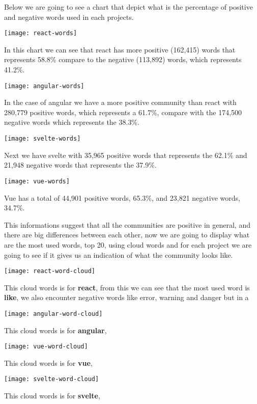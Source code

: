 Below we are going to see a chart that depict what is the percentage of positive and negative words used in each projects.

\begin{center}
    \texttt{[image: react-words]}    
\end{center}

In this chart we can see that react has more positive (162,415) words that represents 58.8\% compare to the negative (113,892) words, which represents 41.2\%.

\begin{center}
    \texttt{[image: angular-words]}    
\end{center}

In the case of angular we have a more positive community than react with 280,779 positive words, which represents a 61.7\%, compare with the 174,500 negative words which represents the 38.3\%.

\begin{center}
    \texttt{[image: svelte-words]}    
\end{center}

Next we have svelte with 35,965 positive words that represents the 62.1\% and 21,948 negative words that represents the 37.9\%.

\begin{center}
    \texttt{[image: vue-words]}    
\end{center}

Vue has a total of 44,901 positive words, 65.3\%, and 23,821 negative words, 34.7\%.

This informations suggest that all the communities are positive in general, and there are big differences between each other, now we are going to display what are the most used words, top 20, using cloud words and for each project we are going to see if it gives us an indication of what the community looks like.

\begin{center}
    \texttt{[image: react-word-cloud]}    
\end{center}

This cloud words is for \textbf{react}, from this we can see that the most used word is \textbf{like}, we also encounter negative words like error, warning and danger but in a  

\begin{center}
    \texttt{[image: angular-word-cloud]}    
\end{center}

This cloud words is for \textbf{angular}, 

\begin{center}
    \texttt{[image: vue-word-cloud]}    
\end{center}

This cloud words is for \textbf{vue}, 

\begin{center}
    \texttt{[image: svelte-word-cloud]}    
\end{center}

This cloud words is for \textbf{svelte}, 


